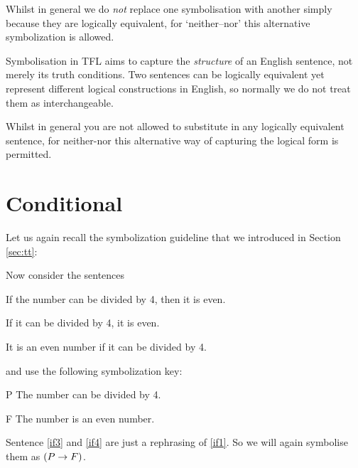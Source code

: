 Whilst in general we do \emph{not} replace one symbolisation with another simply because they are logically equivalent, for `neither--nor' this alternative symbolization is allowed. 

Symbolisation in TFL aims to capture the \emph{structure} of an English sentence, not merely its truth conditions. Two sentences can be logically equivalent yet represent different logical constructions in English, so normally we do not treat them as interchangeable.


Whilst in general you are not allowed to substitute in any logically equivalent sentence, for neither-nor this alternative way of capturing the logical form is permitted. 


\section{Conditional}
Let us again recall the symbolization guideline that we introduced in Section \ref{sec:tt}:


\noindent Now consider the sentences
\begin{earg}
	\item[\ex{if1}] If the number can be divided by 4, then it is even. 
		\item[\ex{if3}] If it can be divided by 4, it is even. 
		\item[\ex{if4}] It is an even number if it can be divided by 4.
\end{earg}

and use the following symbolization key:
	\begin{ekey}
		\item[P] The number can be divided by 4.
		\item[F] The number is an even number.
	\end{ekey}
Sentence \ref{if3} and \ref{if4} are just a rephrasing of \ref{if1}. So we will again symbolise them as $(P\rightarrow F)$.

